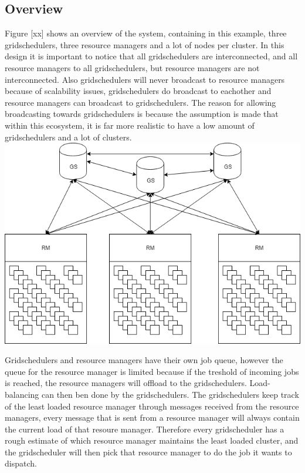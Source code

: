 \documentclass[a4paper]{article}
\begin{document}
\subsection{Overview}
Figure [xx] shows an overview of the system, containing in this example, three gridschedulers, three resource managers and a lot of nodes per cluster.
In this design it is important to notice that all gridschedulers are interconnected, and all resource managers to all gridschedulers, but resource managers are not interconnected.
Also gridschedulers will never broadcast to resource managers because of scalability issues, gridschedulers do broadcast to eachother and resource managers can broadcast to gridschedulers.
The reason for allowing broadcasting towards gridschedulers is because the assumption is made that within this ecosystem, it is far more realistic to have a low amount of gridschedulers and a lot of clusters. \\
\includegraphics[scale=0.5]{design-overview.png}

Gridschedulers and resource managers have their own job queue, however the queue for the resource manager is limited because if the treshold of incoming jobs is reached, the resource managers will offload to the gridschedulers.
Load-balancing can then ben done by the gridschedulers. 
The gridschedulers keep track of the least loaded resource manager through messages received from the resource managers, every message that is sent from a resource manager will always contain the current load of that resoure manager.
Therefore every gridscheduler has a rough estimate of which resource manager maintains the least loaded cluster, and the gridscheduler will then pick that resource manager to do the job it wants to dispatch. \\
\end{document}
